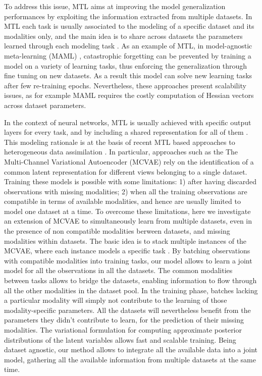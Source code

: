 To address this issue, MTL aims at improving the model generalization performances by exploiting the information extracted from multiple datasets.
In MTL each task is usually associated to the modeling of a specific dataset and its modalities only,
and the main idea is to share across datasets the parameters learned through each modeling task \citep{Caruana1998, Dorado-Moreno2020}.
As an example of MTL, in model-agnostic meta-learning (MAML) \citep{MAML1}, catastrophic forgetting can be prevented by training a model on a variety of learning tasks, thus enforcing the generalization through fine tuning on new datasets.
As a result this model can solve new learning tasks after few re-training epochs.
Nevertheless, these approaches present scalability issues, as for example MAML requires the costly computation of Hessian vectors across dataset parameters.

In the context of neural networks, MTL is usually achieved with specific output layers for every task, and by including a shared representation for all of them \citep{Dorado-Moreno2020}.
This modeling rationale is at the basis of recent MTL based approaches to heterogeneous data assimilation \citep{Wu2018, Antelmi2019, Shi2019}.
In particular, approaches such as the The Multi-Channel Variational Autoencoder (MCVAE) \citep{Antelmi2019} rely on the identification of a common latent representation for different views belonging to a single dataset.
Training these models is possible with some limitations:
1) after having discarded observations with missing modalities;
2) when all the training observations are compatible in terms of available modalities, and hence are usually limited to model one dataset at a time.
%
To overcome these limitations, here we investigate an extension of MCVAE to simultaneously learn from multiple datasets, even in the presence of non compatible modalities berween datasets, and missing modalities within datasets.
The basic idea is to stack multiple instances of the MCVAE, where each instance models a specific task .
By batching observations with compatible modalities into training tasks, our model allows to learn a joint model for all the observations in all the datasets.
The common modalities between tasks allows to bridge the datasets, enabling information to flow through all the other modalities in the dataset pool.
In the training phase, batches lacking a particular modality will simply not contribute to the learning of those modality-specific parameters.
All the datasets will nevertheless benefit from the parameters they didn't contribute to learn, for the prediction of their missing modalities.
The variational formulation for computing approximate posterior distributions of the latent variables allows fast and scalable training.
Being dataset agnostic, our method allows to integrate all the available data into a joint model, gathering  all the available information from multiple datasets at the same time.

